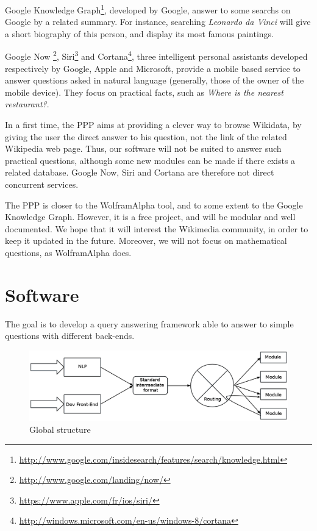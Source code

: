 \documentclass[a4paper,10pt]{article}
\begin{document}
Google Knowledge Graph\footnote{\url{http://www.google.com/insidesearch/features/search/knowledge.html}}, developed by Google, answer to some searchs on Google by a 
related summary. For instance, searching \emph{Leonardo da Vinci} will give a short
biography of this person, and display its most famous paintings.

Google Now \footnote{\url{http://www.google.com/landing/now/}}, Siri\footnote{
\url{https://www.apple.com/fr/ios/siri/}} and Cortana\footnote{\url{http://windows.microsoft.com/en-us/windows-8/cortana}}, three intelligent personal 
assistants developed respectively by Google, Apple and Microsoft, provide a mobile 
based service to answer questions asked in natural language (generally, those of 
the owner of the mobile device). They focus on practical facts, such as \emph{Where 
is the nearest restaurant?}.

In a first time, the PPP aims at providing a clever way to browse Wikidata, by giving the 
user the direct answer to his question, not the link of the related Wikipedia
web page. Thus, our software will not be suited to answer such practical questions,
although some new modules can be made if there exists a related database. Google Now, Siri
and Cortana are therefore not direct concurrent services.

The PPP is closer to the WolframAlpha tool, and to some extent to the Google Knowledge 
Graph. However, it is a free project,
and will be modular and well documented. We hope that it will interest the 
Wikimedia community, in order to keep it updated in the future. Moreover,
we will not focus on mathematical questions, as WolframAlpha does.

\section{Software}

The goal is to develop a query answering framework able to answer to simple questions with different back-ends. 

\begin{figure}[!ht]
    \centering
    \includegraphics[scale=0.40]{images/Structure-PPP-en.eps}
    \caption{Global structure}
\end{figure}
\end{document}
